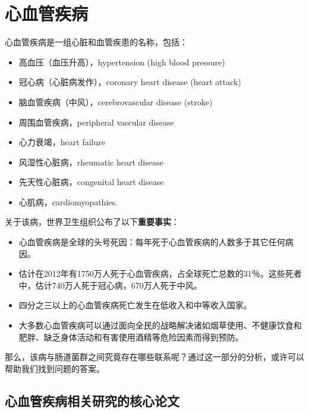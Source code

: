 \documentclass[]{ctexbook}
\providecommand{\tightlist}{%
  \setlength{\itemsep}{0pt}\setlength{\parskip}{0pt}}
\begin{document}
\hypertarget{CVD}{%
\section{心血管疾病}\label{CVD}}

心血管疾病是一组心脏和血管疾患的名称，包括：

\begin{itemize}
\tightlist
\item
  高血压（血压升高），hypertension (high blood pressure)
\item
  冠心病（心脏病发作），coronary heart disease (heart attack)
\item
  脑血管疾病（中风），cerebrovascular disease (stroke)
\item
  周围血管疾病，peripheral vascular disease
\item
  心力衰竭，heart failure
\item
  风湿性心脏病，rheumatic heart disease
\item
  先天性心脏病，congenital heart disease
\item
  心肌病，cardiomyopathies.
\end{itemize}

关于该病，世界卫生组织公布了以下\textbf{重要事实}：

\begin{itemize}
\tightlist
\item
  心血管疾病是全球的头号死因：每年死于心血管疾病的人数多于其它任何病因。
\item
  估计在2012年有1750万人死于心血管疾病，占全球死亡总数的31％。这些死者中，估计740万人死于冠心病，670万人死于中风。
\item
  四分之三以上的心血管疾病死亡发生在低收入和中等收入国家。
\item
  大多数心血管疾病可以通过面向全民的战略解决诸如烟草使用、不健康饮食和肥胖、缺乏身体活动和有害使用酒精等危险因素而得到预防。
\end{itemize}

那么，该病与肠道菌群之间究竟存在哪些联系呢？通过这一部分的分析，或许可以帮助我们找到问题的答案。

\hypertarget{ux5fc3ux8840ux7ba1ux75beux75c5ux76f8ux5173ux7814ux7a76ux7684ux6838ux5fc3ux8bbaux6587}{%
\subsection{心血管疾病相关研究的核心论文}\label{ux5fc3ux8840ux7ba1ux75beux75c5ux76f8ux5173ux7814ux7a76ux7684ux6838ux5fc3ux8bbaux6587}}
\end{document}
